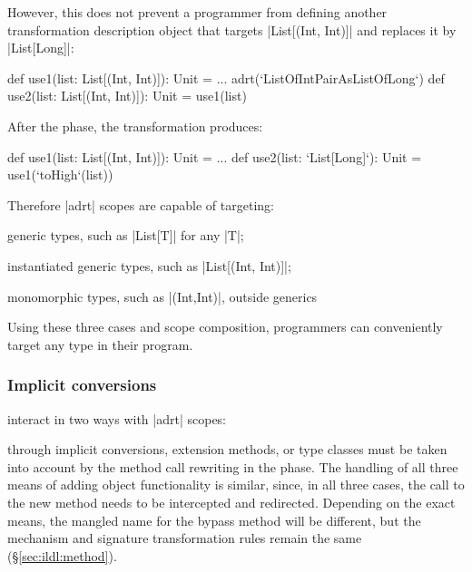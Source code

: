 However, this does not prevent a programmer from defining another transformation description object that targets |List[(Int, Int)]| and replaces it by |List[Long]|:

\begin{lstlisting-nobreak}
def use1(list: List[(Int, Int)]): Unit = ...
adrt(`ListOfIntPairAsListOfLong`) {
  def use2(list: List[(Int, Int)]): Unit = use1(list)
}
\end{lstlisting-nobreak}

After the \commit{} phase, the transformation produces:

\begin{lstlisting-nobreak}
def use1(list: List[(Int, Int)]): Unit = ...
def use2(list: `List[Long]`): Unit = use1(`toHigh`(list))
\end{lstlisting-nobreak}

Therefore |adrt| scopes are capable of targeting:
\begin{compactitem}
\item generic types, such as |List[T]| for any |T|;
\item instantiated generic types, such as |List[(Int, Int)]|;
\item monomorphic types, such as |(Int,Int)|, outside generics
\end{compactitem}

\noindent
Using these three cases and scope composition, programmers can conveniently target any type in their program.

\subsubsection{Implicit conversions}
\label{sec:ildl:language-implicit-conversions}
interact in two ways with |adrt| scopes:

\noindent
{} through implicit conversions, extension methods, or type classes must be taken into account by the method call rewriting in the \coerce{} phase. The handling of all three means of adding object functionality is similar, since, in all three cases, the call to the new method needs to be intercepted and redirected. Depending on the exact means, the mangled name for the bypass method will be different, but the mechanism and signature transformation rules remain the same (\S\ref{sec:ildl:method}).

